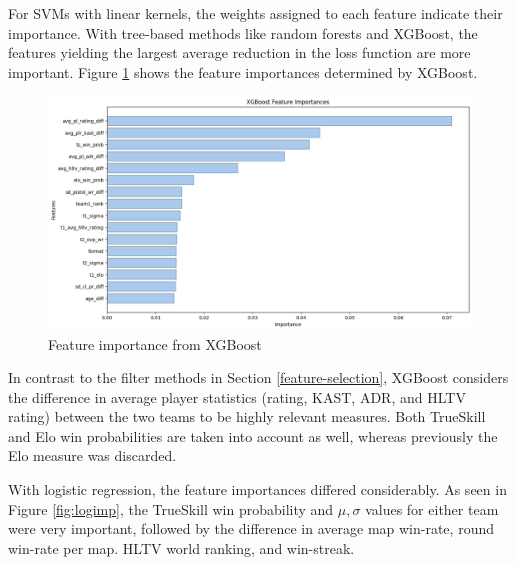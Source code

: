For SVMs with linear kernels, the weights assigned to each feature indicate their importance. With tree-based methods like random forests and XGBoost, the features yielding the largest average reduction in the loss function are more important. Figure \ref{fig:xgbimp} shows the feature importances determined by XGBoost.

\begin{figure}[h]
	\centering
	\begin{adjustbox}{center}
		\includegraphics[width=1.3\textwidth]{Figures/xgb-imp.png}
	\end{adjustbox}
	\caption{Feature importance from XGBoost}
	\label{fig:xgbimp}
\end{figure}

In contrast to the filter methods in Section \ref{feature-selection}, XGBoost considers the difference in average player statistics (rating, KAST, ADR, and HLTV rating) between the two teams to be highly relevant measures. Both TrueSkill and Elo win probabilities are taken into account as well, whereas previously the Elo measure was discarded. 

With logistic regression, the feature importances differed considerably. As seen in Figure \ref{fig:logimp}, the TrueSkill win probability and $\mu,\sigma$ values for either team were very important, followed by the difference in average map win-rate, round win-rate per map. HLTV world ranking, and win-streak.

\clearpage

